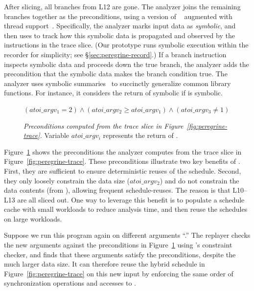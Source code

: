 After slicing, all branches from L12 are gone.  The
analyzer joins the remaining branches together as the
preconditions, using a version of \klee~\cite{klee:osdi08} augmented with
thread support~\cite{cui:tern:osdi10}.  Specifically, the analyzer marks
input data as \emph{symbolic}, and then uses \klee to track how this symbolic
data is propagated and observed by the instructions in the trace slice.
(Our \peregrine prototype runs symbolic execution within the recorder for
simplicity; see \S\ref{sec:peregrine-record}.)
If a branch instruction inspects symbolic data and proceeds down the true
branch, the analyzer adds the precondition that the symbolic data makes
the branch condition true.  The analyzer uses symbolic
summaries~\cite{castro:bouncer} to succinctly generalize common library
functions.  For instance, it considers the return of 
symbolic if  is symbolic.

\begin{figure}[t]
\centering
\begin{minipage}[t]{3.1in}
\begin{scriptsize}
$(atoi\_argv_1 = 2) \wedge (atoi\_argv_2 \geq atoi\_argv_1) \wedge
  (atoi\_argv_3 \neq 1) $
\end{scriptsize}
\end{minipage}
\caption{{\em Preconditions computed from the trace slice in
    Figure~\ref{fig:peregrine-trace}.}  Variable $atoi\_argv_i$ represents the
  return of .} \label{fig:peregrine-precond}
\end{figure}

Figure~\ref{fig:peregrine-precond} shows the preconditions the analyzer computes
from the trace slice in Figure~\ref{fig:peregrine-trace}.
These preconditions illustrate two key benefits of \peregrine.
First, they are sufficient to ensure deterministic reuses of the schedule.
Second, they only loosely constrain the data size ($atoi\_argv_2$) and do
not constrain the data contents (from ), allowing frequent
schedule-reuses.  The reason is that L10--L13 are all sliced out.
One way to leverage this benefit is to populate a
schedule cache with small workloads to reduce analysis time, and then
reuse the schedules on large workloads.

Suppose we run this program again on different arguments ``.''
The replayer checks the new arguments against the preconditions in
Figure~\ref{fig:peregrine-precond} using \klee's constraint checker, and finds that these
arguments satisfy the preconditions, despite the much larger data size.  
It can therefore reuse the hybrid schedule in Figure~\ref{fig:peregrine-trace}
on this new input by enforcing
the same order of synchronization operations and accesses
to .


